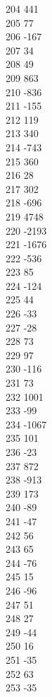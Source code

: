 { 204	441 \\
 205	77 \\
 206	-167 \\
 207	34 \\
 208	49 \\
 209	863 \\
 210	-836 \\
 211	-155 \\
 212	119 \\
 213	340 \\
 214	-743 \\
 215	360 \\
 216	28 \\
 217	302 \\
 218	-696 \\
 219	4748 \\
 220	-2193 \\
 221	-1676 \\
 222	-536 \\
 223	85 \\
 224	-124 \\
 225	44 \\
 226	-33 \\
 227	-28 \\
 228	73 \\
 229	97 \\
 230	-116 \\
 231	73 \\
 232	1001 \\
 233	-99 \\
 234	-1067 \\
 235	101 \\
 236	-23 \\
 237	872 \\
 238	-913 \\
 239	173 \\
 240	-89 \\
 241	-47 \\
 242	56 \\
 243	65 \\
 244	-76 \\
 245	15 \\
 246	-96 \\
 247	51 \\
 248	27 \\
 249	-44 \\
 250	16 \\
 251	-35 \\
 252	63 \\
 253	-35 \\
}
